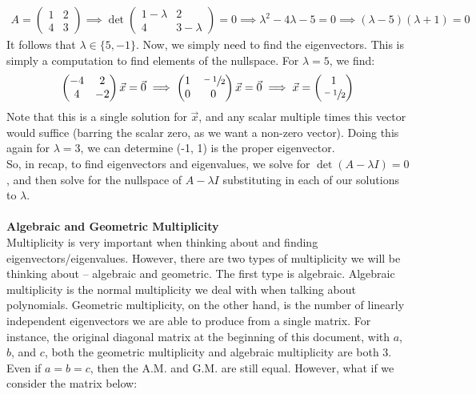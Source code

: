 \documentclass[12pt]{amsart}
\begin{document}
\begin{align*}
	A = \begin{pmatrix}1&2\\4&3\end{pmatrix} \implies \det \begin{pmatrix}1-\lambda&2\\4&3-\lambda\end{pmatrix} = 0 \implies \lambda^2 - 4\lambda - 5 = 0 \implies (\lambda - 5)(\lambda + 1) = 0
\end{align*}
It follows that $\lambda \in \{5, -1\}$. Now, we simply need to find the eigenvectors. This is simply a computation to find elements of the nullspace. For $\lambda = 5$, we find:
\[\begin{pmatrix}-4&2\\4&-2\end{pmatrix}\vec{x} = \vec{0} \implies \begin{pmatrix}1&\sfrac{-1}{2}\\0&0\end{pmatrix}\vec{x} = \vec{0} \implies \vec{x} = \begin{pmatrix}1 \\ \sfrac{-1}{2}\end{pmatrix}\]
Note that this is a single solution for $\vec{x}$, and any scalar multiple times this vector would suffice (barring the scalar zero, as we want a non-zero vector). Doing this again for $\lambda = 3$, we can determine (-1, 1) is the proper eigenvector.\\
So, in recap, to find eigenvectors and eigenvalues, we solve for $\det (A - \lambda I) = 0$, and then solve for the nullspace of $A - \lambda I$ substituting in each of our solutions to $\lambda$.\\
\\
\textbf{Algebraic and Geometric Multiplicity}\\
Multiplicity is very important when thinking about and finding eigenvectors/eigenvalues. However, there are two types of multiplicity we will be thinking about -- algebraic and geometric. The first type is algebraic. Algebraic multiplicity is the normal multiplicity we deal with when talking about polynomials. Geometric multiplicity, on the other hand, is the number of linearly independent eigenvectors we are able to produce from a single matrix. For instance, the original diagonal matrix at the beginning of this document, with $a$, $b$, and $c$, both the geometric multiplicity and algebraic multiplicity are both $3$. Even if $a=b=c$, then the A.M. and G.M. are still equal. However, what if we consider the matrix below:
\end{document}
